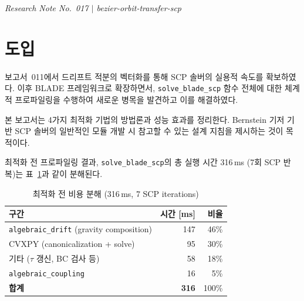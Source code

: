 \documentclass[11pt]{article}
\begin{document}
\drawborder
\thispagestyle{firstpage}


{\normalsize\textit{Research Note No.~017 $|$ bezier-orbit-transfer-scp}}\par\medskip

\def\lighterdate{March 12, 2026}


\begin{abstract}
BLADE 기반 SCP 궤도전이 최적화 솔버
\texttt{solve\_blade\_scp}의 수치 병목을 분석하고
4가지 최적화 기법을 적용하여 316\,ms에서 175\,ms로
1.81배 속도 향상을 달성하였다.
가장 큰 기여는 CVXPY의 DPP 캐싱 전략으로,
반복당 canonicalization 오버헤드를
57\,ms에서 3\,ms로 19배 절감하였다.
차수 올림의 closed-form 행렬화,
\texttt{bern\_product}의 einsum 퓨전,
Horner form 시도의 실패 분석을 함께 기술하여,
Bernstein 대수 프레임워크에서의
성능 최적화 방법론을 정리한다.
\end{abstract}

\section{도입}

보고서~011\cite{report011}에서 드리프트 적분의 벡터화를 통해
SCP 솔버의 실용적 속도를 확보하였다.
이후 BLADE 프레임워크\cite{efc005, report016}로 확장하면서,
\texttt{solve\_blade\_scp} 함수 전체에 대한 체계적 프로파일링을 수행하여
새로운 병목을 발견하고 이를 해결하였다.

본 보고서는 4가지 최적화 기법의 방법론과 성능 효과를 정리한다.
Bernstein 기저 기반 SCP 솔버의 일반적인 모듈 개발 시
참고할 수 있는 설계 지침을 제시하는 것이 목적이다.

최적화 전 프로파일링 결과, \texttt{solve\_blade\_scp}의 총 실행 시간
316\,ms (7회 SCP 반복)는 표~\ref{tab:before}과 같이 분해된다.

\begin{table}[h]
\centering
\caption{최적화 전 비용 분해 (316\,ms, 7 SCP iterations)}
\label{tab:before}
\begin{tabular}{lrr}
\toprule
구간 & 시간 [ms] & 비율 \\
\midrule
\texttt{algebraic\_drift} (gravity composition) & 147 & 46\% \\
CVXPY (canonicalization + solve) & 95 & 30\% \\
기타 ($\tau$ 갱신, BC 검사 등) & 58 & 18\% \\
\texttt{algebraic\_coupling} & 16 & 5\% \\
\midrule
\textbf{합계} & \textbf{316} & 100\% \\
\bottomrule
\end{tabular}
\end{table}
\end{document}
